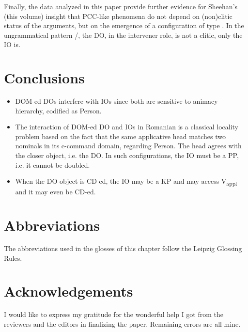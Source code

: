 \documentclass[output=paper,colorlinks,citecolor=brown,nonflat]{langsci/langscibook}
\begin{document}
Finally, the data analyzed in this paper provide further evidence for Sheehan’s (this volume) insight that PCC-like phenomena do not depend on (non)clitic status of the arguments, but on the emergence of a configuration of type . In the ungrammatical pattern /, the DO, in the intervener role, is not a clitic, only the IO is.

\section{Conclusions} %

\begin{itemize}
\item DOM-ed DOs interfere with IOs since both are sensitive to animacy hierarchy, codified as Person.
\item
The interaction of DOM-ed DO and IOs in Romanian is a classical locality problem based on the fact that the same applicative head matches two nominals in its c-command domain, regarding Person. The head agrees with the closer object, i.e. the DO. In such configurations, the IO must be a PP, i.e. it cannot be doubled.
\item
 When the DO object is CD-ed, the IO may be a KP and may access V\textsubscript{appl} and it may even be CD-ed.
\end{itemize}


\section*{Abbreviations}
The abbreviations used in the glosses of this chapter follow the Leipzig Glossing Rules.


\section*{Acknowledgements}
I would like to express my gratitude for the wonderful help I got from the reviewers and the editors in finalizing the paper. Remaining errors are all mine.



\sloppy\printbibliography[heading=subbibliography,notkeyword=this]
\end{document}
